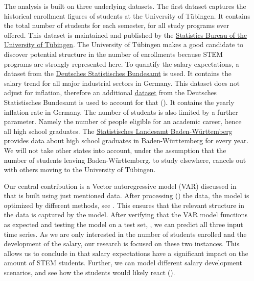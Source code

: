 \documentclass{article}
\theoremstyle{plain}
\theoremstyle{definition}
\theoremstyle{remark}
\begin{document}
The analysis is built on three underlying datasets.
The first dataset captures the historical enrollment figures of students at the University of Tübingen. 
It contains the total number of students for each semester, for all study programs ever offered. This dataset is maintained and published by the
\href{https://uni-tuebingen.de/einrichtungen/verwaltung/iv-studierende/studierendenabteilung/statistiken/}{Statistics Bureau of the University of Tübingen}.
The University of Tübingen makes a good candidate to discover potential structure in the number
of enrollments because STEM programs are strongly represented here.
To quantify the salary expectations, a dataset from the \href{https://www-genesis.destatis.de/genesis//online?operation=table&code=62321-0001&bypass=true&levelindex=0&levelid=1702307320529#abreadcrumb}{Deutsches Statistisches Bundesamt} is used.
It contains the salary trend for all major industrial sectors in Germany. This dataset does not adjust for inflation,
therefore an additional \href{https://www-genesis.destatis.de/genesis//online?operation=table&code=61121-0001&bypass=true&levelindex=0&levelid=1706446467491#abreadcrumb}{dataset}
from the Deutsches Statistisches Bundesamt is used to account for that (). It contains the yearly inflation rate in Germany.
The number of students is also limited by a further parameter. Namely the number of people eligible for an academic career, hence all high school graduates.
The \href{https://www.statistik-bw.de/BildungKultur/SchulenAllgem/LRt0302.jsp}{Statistisches Landesamt Baden-Württemberg} provides
data about high school graduates in Baden-Württemberg for every year. We will not take other states into account, under
the assumption that the number of students leaving Baden-Württemberg, to study elsewhere, cancels out with others moving to the University of Tübingen.

Our central contribution is a Vector autoregressive model (VAR) discussed in  that is built using just mentioned data.
After processing () the data, the model is optimized by different methods, see .
This ensures that the relevant structure in the data is captured by the model.
After verifying that the VAR model functions as expected and testing the model on a test set, , we
can predict all three input time series. As we are only interested in the number of students enrolled and the development of the salary, our research is 
focused on these two instances.
This allows us to conclude in  that salary expectations have a significant impact on the amount of STEM students.
Further, we can model different salary development scenarios, and see how the students would likely react ().
\end{document}
